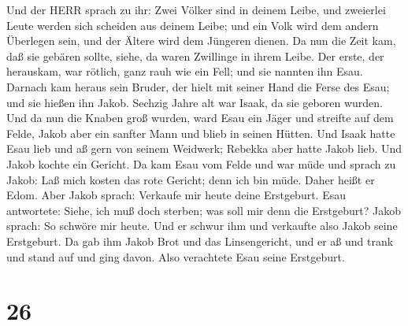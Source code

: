 Und der HERR sprach zu ihr: Zwei Völker sind in deinem Leibe, und
zweierlei Leute werden sich scheiden aus deinem Leibe; und ein Volk wird
dem andern Überlegen sein, und der Ältere wird dem Jüngeren dienen.
 Da nun die Zeit kam, daß sie gebären sollte, siehe, da
waren Zwillinge in ihrem Leibe.  Der erste, der herauskam,
war rötlich, ganz rauh wie ein Fell; und sie nannten ihn Esau.
 Darnach kam heraus sein Bruder, der hielt mit seiner Hand
die Ferse des Esau; und sie hießen ihn Jakob. Sechzig Jahre alt war
Isaak, da sie geboren wurden.  Und da nun die Knaben groß
wurden, ward Esau ein Jäger und streifte auf dem Felde, Jakob aber ein
sanfter Mann und blieb in seinen Hütten.  Und Isaak hatte
Esau lieb und aß gern von seinem Weidwerk; Rebekka aber hatte Jakob
lieb.  Und Jakob kochte ein Gericht. Da kam Esau vom Felde
und war müde  und sprach zu Jakob: Laß mich kosten das rote
Gericht; denn ich bin müde. Daher heißt er Edom.  Aber
Jakob sprach: Verkaufe mir heute deine Erstgeburt.  Esau
antwortete: Siehe, ich muß doch sterben; was soll mir denn die
Erstgeburt?  Jakob sprach: So schwöre mir heute. Und er
schwur ihm und verkaufte also Jakob seine Erstgeburt.  Da
gab ihm Jakob Brot und das Linsengericht, und er aß und trank und stand
auf und ging davon. Also verachtete Esau seine Erstgeburt.

\hypertarget{section-25}{%
\section{26}\label{section-25}}

